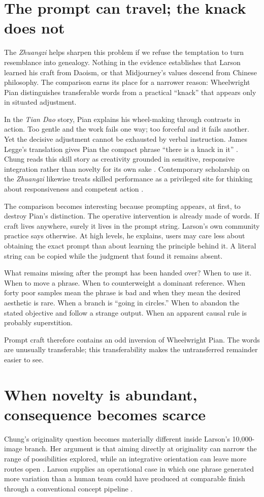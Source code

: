 \documentclass[11pt]{article}
\begin{document}
\section{The prompt can travel; the knack does not}
The \emph{Zhuangzi} helps sharpen this problem if we refuse the temptation to turn resemblance into genealogy. Nothing in the evidence establishes that Larson learned his craft from Daoism, or that Midjourney's values descend from Chinese philosophy. The comparison earns its place for a narrower reason: Wheelwright Pian distinguishes transferable words from a practical ``knack'' that appears only in situated adjustment.

In the \emph{Tian Dao} story, Pian explains his wheel-making through contrasts in action. Too gentle and the work fails one way; too forceful and it fails another. Yet the decisive adjustment cannot be exhausted by verbal instruction. James Legge's translation gives Pian the compact phrase ``there is a knack in it'' \cite{Legge1891Taoism}. Chung reads this skill story as creativity grounded in sensitive, responsive integration rather than novelty for its own sake \cite{Chung2020Originality}. Contemporary scholarship on the \emph{Zhuangzi} likewise treats skilled performance as a privileged site for thinking about responsiveness and competent action \cite{Fraser2024Forget}.

The comparison becomes interesting because prompting appears, at first, to destroy Pian's distinction. The operative intervention is already made of words. If craft lives anywhere, surely it lives in the prompt string. Larson's own community practice says otherwise. At high levels, he explains, users may care less about obtaining the exact prompt than about learning the principle behind it. A literal string can be copied while the judgment that found it remains absent.

What remains missing after the prompt has been handed over? When to use it. When to move a phrase. When to counterweight a dominant reference. When forty poor samples mean the phrase is bad and when they mean the desired aesthetic is rare. When a branch is ``going in circles.'' When to abandon the stated objective and follow a strange output. When an apparent causal rule is probably superstition.

Prompt craft therefore contains an odd inversion of Wheelwright Pian. The words are unusually transferable; this transferability makes the untransferred remainder easier to see.

\section{When novelty is abundant, consequence becomes scarce}
Chung's originality question becomes materially different inside Larson's 10,000-image branch. Her argument is that aiming directly at originality can narrow the range of possibilities explored, while an integrative orientation can leave more routes open \cite{Chung2020Originality}. Larson supplies an operational case in which one phrase generated more variation than a human team could have produced at comparable finish through a conventional concept pipeline \cite{Larson2022}.
\end{document}
